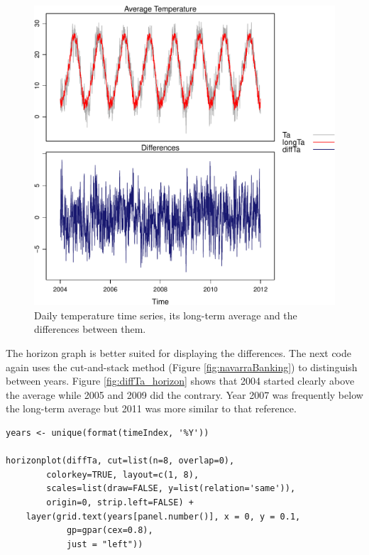 \begin{figure}[htb]
\centering
\includegraphics[width=.9\linewidth]{figs/diffTa_xyplot.pdf}
\caption{\label{fig:diffTa_xyplot}Daily temperature time series, its long-term average and the differences between them.}
\end{figure}

The horizon graph is better suited for displaying the differences. The
next code again uses the cut-and-stack method (Figure
\ref{fig:navarraBanking}) to distinguish between years. Figure
\ref{fig:diffTa_horizon} shows that 2004 started clearly above the
average while 2005 and 2009 did the contrary. Year 2007 was frequently
below the long-term average but 2011 was more similar to that
reference.
\lstset{language=R,numbers=none}
\begin{lstlisting}
years <- unique(format(timeIndex, '%Y'))

horizonplot(diffTa, cut=list(n=8, overlap=0),
	    colorkey=TRUE, layout=c(1, 8),
	    scales=list(draw=FALSE, y=list(relation='same')),
	    origin=0, strip.left=FALSE) +
    layer(grid.text(years[panel.number()], x = 0, y = 0.1, 
		    gp=gpar(cex=0.8),
		    just = "left"))
\end{lstlisting}


